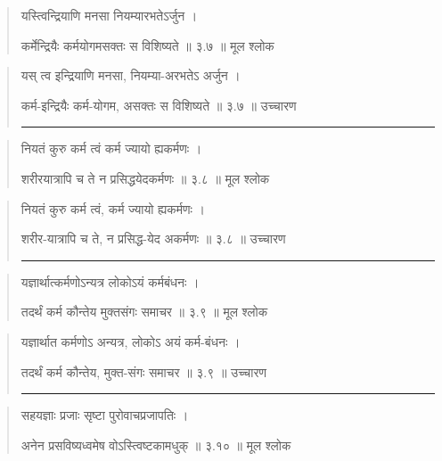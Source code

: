 \begin{quotation}

यस्त्विन्द्रियाणि मनसा नियम्यारभतेऽर्जुन  ।  

कर्मेन्द्रियैः कर्मयोगमसक्तः स विशिष्यते  ॥ ३.७ ॥  मूल श्लोक
\end{quotation}

\begin{quotation}

यस् त्व इन्द्रियाणि मनसा, नियम्या-अरभतेऽ अर्जुन  ।  

कर्म-इन्द्रियैः कर्म-योगम, असक्तः स विशिष्यते  ॥ ३.७ ॥  उच्चारण

\noindent\rule{16cm}{0.4pt} 
\end{quotation}


\begin{quotation}

नियतं कुरु कर्म त्वं कर्म ज्यायो ह्यकर्मणः ।  

शरीरयात्रापि च ते न प्रसिद्धयेदकर्मणः  ॥ ३.८ ॥  मूल श्लोक
\end{quotation}

\begin{quotation}

नियतं कुरु कर्म त्वं, कर्म ज्यायो ह्यकर्मणः ।  

शरीर-यात्रापि च ते, न प्रसिद्ध-येद अकर्मणः  ॥ ३.८ ॥  उच्चारण

\noindent\rule{16cm}{0.4pt} 
\end{quotation}


\begin{quotation}

यज्ञार्थात्कर्मणोऽन्यत्र लोकोऽयं कर्मबंधनः  ।  

तदर्थं कर्म कौन्तेय मुक्तसंगः समाचर  ॥ ३.९ ॥  मूल श्लोक
\end{quotation}

\begin{quotation}

यज्ञार्थात कर्मणोऽ अन्यत्र, लोकोऽ अयं कर्म-बंधनः  ।  

तदर्थं कर्म कौन्तेय, मुक्त-संगः समाचर  ॥ ३.९ ॥  उच्चारण

\noindent\rule{16cm}{0.4pt} 
\end{quotation}


\begin{quotation}

सहयज्ञाः प्रजाः सृष्टा पुरोवाचप्रजापतिः  ।  

अनेन प्रसविष्यध्वमेष वोऽस्त्विष्टकामधुक्‌  ॥ ३.१० ॥  मूल श्लोक
\end{quotation}

